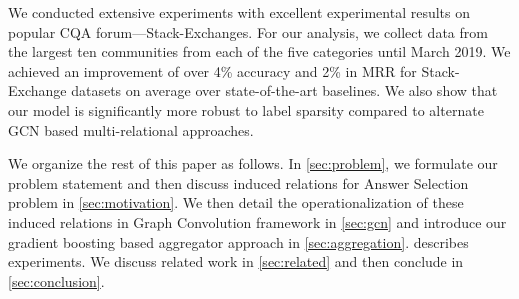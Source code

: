 We conducted extensive experiments with excellent experimental results on popular CQA forum---Stack-Exchanges. For our analysis, we collect data from the largest ten communities from each of the five categories until March 2019. We achieved an improvement of over 4\% accuracy and 2\% in MRR for Stack-Exchange datasets on average over state-of-the-art baselines. We also show that our model is significantly more robust to label sparsity compared to alternate GCN based multi-relational approaches.

We organize the rest of this paper as follows. In \cref{sec:problem}, we formulate our problem statement and then discuss induced relations for Answer Selection problem in \cref{sec:motivation}. We then detail the operationalization of these induced relations in Graph Convolution framework in \cref{sec:gcn} and introduce our gradient boosting based aggregator approach in \cref{sec:aggregation}.  describes experiments. We discuss related work in \cref{sec:related} and then conclude in \cref{sec:conclusion}.


